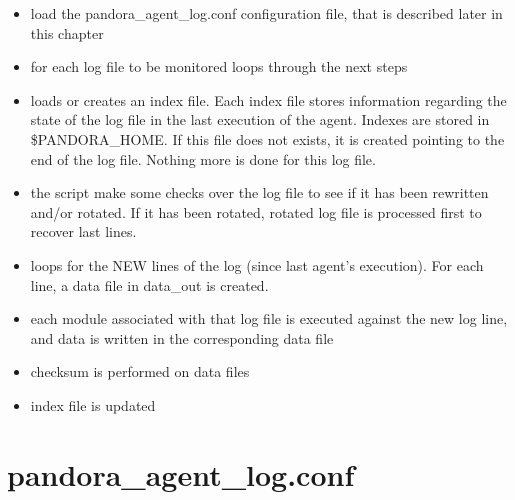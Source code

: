 \documentclass[a4paper,10pt]{article}
\begin{document}
\begin{itemize}
        
          
\item	    load the pandora\_agent\_log.conf configuration file, that is
	    described later in this chapter
	  
        
        
          
\item	    for each log file to be monitored loops through the next steps
	  
        
        
          
\item	    loads or creates an index file. Each index file stores 
	    information regarding the state of the log file in the last 
	    execution of the agent. Indexes are stored in \$PANDORA\_HOME. If this file does not exists, it is created pointing to the end of the log file. Nothing more is done for this log file.
	  
        
        
          
\item	    the script make some checks over the log file to see if it has
	    been rewritten and/or rotated. If it has been rotated, rotated
	    log file is processed first to recover last lines.
	  
        
        
          
\item	    loops for the NEW lines of the log (since last agent's 
	    execution). For each line, a data file in data\_out is created.
	  
        
        
          
\item	    each module associated with that log file is executed against
	    the new log line, and data is written in the corresponding data
	    file
	  
        
        
          
\item	    checksum is performed on data files
	  

\item 	index file is updated

        
\end{itemize}





\section{pandora\_agent\_log.conf}\label{sec:agent.conf}
\end{document}
